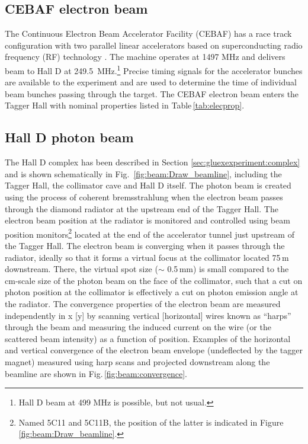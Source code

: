\subsection{CEBAF electron beam \label{sec:ebeam}}
The Continuous Electron Beam Accelerator Facility (CEBAF) has a race track configuration with two parallel linear accelerators based on superconducting radio frequency (RF) technology \cite{Leemann:2001dg}. The machine operates at 1497 MHz and delivers beam to Hall D at 249.5~MHz.\footnote{Hall D beam at 499 MHz is possible, but not usual.} Precise timing signals for the accelerator bunches are available to the experiment and are used to determine the time of individual beam bunches passing through the target. The CEBAF electron beam enters the Tagger Hall with nominal properties listed in Table\,\ref{tab:elecprop}.

\subsection{Hall D photon beam \label{sec:gbeam}}
The Hall D complex has been described in Section \ref{sec:gluexexperiment:complex} and is shown schematically in Fig.~\ref{fig:beam:Draw_beamline}, including the Tagger Hall, the collimator cave and Hall D itself. The photon beam is created using the process of coherent bremsstrahlung \cite{timm1969,LIVINGSTON2009205} when the electron beam passes through the diamond radiator at the upstream end of the Tagger Hall.
The electron beam position at the radiator is monitored and controlled using beam position monitors\footnote{Named 5C11 and 5C11B, the position of the latter is indicated in Figure \ref{fig:beam:Draw_beamline}.} located at the end of the accelerator tunnel just upstream of the Tagger Hall.
The electron beam is converging when it passes through the radiator, ideally
so that it forms a virtual focus at the collimator located 75\,m downstream.
There, the virtual spot size ($\sim$ 0.5\,mm) is small compared to the cm-scale size of the photon beam on the face of the collimator,
such that a cut on photon position at the collimator is effectively a cut on photon emission angle at the radiator. The convergence
properties of the electron beam are measured independently in x [y] by scanning vertical [horizontal] wires known as ``harps''
through the beam and measuring the induced current on the wire (or the scattered beam intensity) as a function of position.
Examples of the horizontal and vertical convergence of the electron beam envelope (undeflected by the tagger magnet)
measured using harp scans and projected downstream along the beamline are shown in Fig.\,\ref{fig:beam:convergence}.

